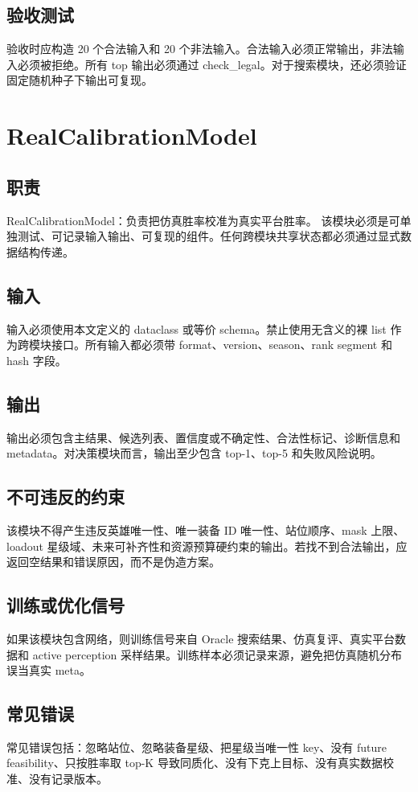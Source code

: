 \documentclass[UTF8,12pt,openany]{ctexbook}
\begin{document}
\subsection{验收测试}
验收时应构造 20 个合法输入和 20 个非法输入。合法输入必须正常输出，非法输入必须被拒绝。所有 top 输出必须通过 check\_legal。对于搜索模块，还必须验证固定随机种子下输出可复现。

\section{RealCalibrationModel}
\subsection{职责}
RealCalibrationModel：负责把仿真胜率校准为真实平台胜率。 该模块必须是可单独测试、可记录输入输出、可复现的组件。任何跨模块共享状态都必须通过显式数据结构传递。

\subsection{输入}
输入必须使用本文定义的 dataclass 或等价 schema。禁止使用无含义的裸 list 作为跨模块接口。所有输入都必须带 format、version、season、rank segment 和 hash 字段。

\subsection{输出}
输出必须包含主结果、候选列表、置信度或不确定性、合法性标记、诊断信息和 metadata。对决策模块而言，输出至少包含 top-1、top-5 和失败风险说明。

\subsection{不可违反的约束}
该模块不得产生违反英雄唯一性、唯一装备 ID 唯一性、站位顺序、mask 上限、loadout 星级域、未来可补齐性和资源预算硬约束的输出。若找不到合法输出，应返回空结果和错误原因，而不是伪造方案。

\subsection{训练或优化信号}
如果该模块包含网络，则训练信号来自 Oracle 搜索结果、仿真复评、真实平台数据和 active perception 采样结果。训练样本必须记录来源，避免把仿真随机分布误当真实 meta。

\subsection{常见错误}
常见错误包括：忽略站位、忽略装备星级、把星级当唯一性 key、没有 future feasibility、只按胜率取 top-K 导致同质化、没有下克上目标、没有真实数据校准、没有记录版本。
\end{document}
